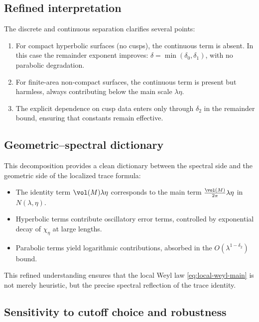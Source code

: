 \subsection{Refined interpretation}

The discrete and continuous separation clarifies several points:

\begin{enumerate}
  \item For compact hyperbolic surfaces (no cusps), the continuous term is absent. In this case the remainder exponent improves: $\delta=\min(\delta_0,\delta_1)$, with no parabolic degradation.
  \item For finite-area non-compact surfaces, the continuous term is present but harmless, always contributing below the main scale $\lambda\eta$.
  \item The explicit dependence on cusp data enters only through $\delta_2$ in the remainder bound, ensuring that constants remain effective.
\end{enumerate}

\subsection{Geometric–spectral dictionary}

This decomposition provides a clean dictionary between the spectral side and the geometric side of the localized trace formula:
\begin{itemize}
  \item The identity term $\vol(M)\lambda\eta$ corresponds to the main term $\tfrac{\vol(M)}{2\pi}\lambda\eta$ in $N(\lambda,\eta)$.
  \item Hyperbolic terms contribute oscillatory error terms, controlled by exponential decay of $\widehat{\chi}_\eta$ at large lengths.
  \item Parabolic terms yield logarithmic contributions, absorbed in the $O(\lambda^{1-\delta_2})$ bound.
\end{itemize}

This refined understanding ensures that the local Weyl law \eqref{eq:local-weyl-main} is not merely heuristic, but the precise spectral reflection of the trace identity.


\subsection{Sensitivity to cutoff choice and robustness}

